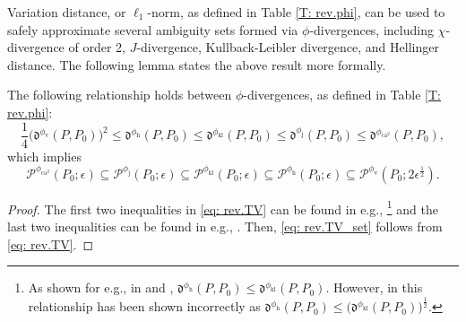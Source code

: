\documentclass[final,onefignum,onetabnum]{class}
\newcommand{\Cs}[1]{\mathcal{#1}} %
\newcommand{\Fs}[1]{\mathfrak{#1}} %
\begin{document}
Variation distance, or $\ell_{1}$-norm, as defined in Table \ref{T: rev.phi}, can be used to safely approximate several ambiguity sets formed via $\phi$-divergences, including $\chi$-divergence of order 2, $J$-divergence, Kullback-Leibler divergence, and Hellinger distance. The following lemma states the above result more formally.
\begin{lemma}
    \label{lem: rev.TV}
    The following relationship holds between $\phi$-divergences, as defined in Table \ref{T: rev.phi}:
    \begin{equation}
        \label{eq: rev.TV}
        \frac{1}{4}\big(\Fs{d}^{\phi_{\text{v}}}(P ,P_{0}) \big)^{2} \le \Fs{d}^{\phi_{\text{h}}}(P , P_{0})   \le \Fs{d}^{\phi_{\text{kl}}}(P , P_{0})  \le \Fs{d}^{\phi_{\text{j}}}(P, P_{0})  \le \Fs{d}^{\phi_{\text{ca}^{2}}}(P , P_{0}), 
    \end{equation}
    which implies
    \begin{equation}
        \label{eq: rev.TV_set}
        \Cs{P}^{\phi_{\text{ca}^{2}}}(P_{0}; \epsilon)  \subseteq \Cs{P}^{\phi_{\text{j}}}(P_{0} ;\epsilon)   \subseteq \Cs{P}^{\phi_{\text{kl}}}(P_{0}; \epsilon)   \subseteq  \Cs{P}^{\phi_{\text{h}}}(P_{0}; \epsilon)  \subseteq \Cs{P}^{\phi_{\text{v}}}(P_{0};2\epsilon^{\frac{1}{2}}). 
    \end{equation}
\end{lemma}
\begin{proof}
The first two inequalities in \eqref{eq: rev.TV} can be found in e.g., \citet[p.~99]{reiss1989}\footnote{As shown for e.g., in \citet{reiss1989} and \cite{gibbs2002}, $\Fs{d}^{\phi_{\text{h}}}(P , P_{0})   \le \Fs{d}^{\phi_{\text{kl}}}(P , P_{0})$. However,  in \citet[Lemma~1]{jiang2016} this relationship has been shown incorrectly as $\Fs{d}^{\phi_{\text{h}}}(P ,P_{0})   \le \big(\Fs{d}^{\phi_{\text{kl}}}(P , P_{0})\big)^{\frac{1}{2}}$.}  and the last two inequalities can be found in e.g., \citet[Lemma~1]{jiang2016}. Then, \eqref{eq: rev.TV_set} follows from \eqref{eq: rev.TV}. 
\end{proof}
\end{document}
